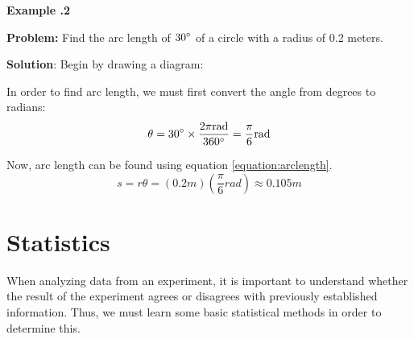 \newpage

  \begin{mdframed}[backgroundcolor=blue!10!white]
	\begin{center}	
		\textbf{Example \thesection.2}	
	\end{center}
	
	\textbf{Problem:} Find the arc length of $30\degree$ of a circle with a radius of 0.2 meters.  
	 
	
	\vspace{0.2 in} 
	\textbf{Solution}: Begin by drawing a diagram:
	
	
	 	  \begin{center}
	\end{center}

	In order to find arc length, we must first convert the angle from degrees to radians:
	\begin{equation*}
	\theta = 30 \degree \times \frac{2 \pi \si{rad}} {360 \degree} = \frac{\pi}{6} \si{rad}
	\end{equation*}
	
	Now, arc length can be found using equation \ref{equation:arclength}.
	\begin{equation*}
		s = r \theta = (0.2 \si{m})(\frac{\pi}{6} \si{rad}) \approx 0.105 \si{m}
	\end{equation*}
\end{mdframed}
	
	
	
	
	\newpage
	\section{Statistics} 
	When analyzing data from an experiment, it is important to understand whether the result of the experiment agrees or disagrees with previously established information.  Thus, we must learn some basic statistical methods in order to determine this.  
	
